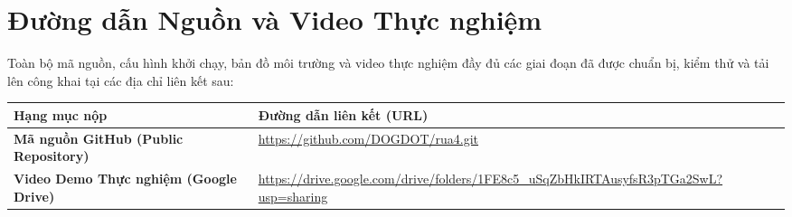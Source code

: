 \documentclass[12pt, a4paper]{article}
\begin{document}
\newpage
\section{Đường dẫn Nguồn và Video Thực nghiệm}

Toàn bộ mã nguồn, cấu hình khởi chạy, bản đồ môi trường và video thực nghiệm đầy đủ các giai đoạn đã được chuẩn bị, kiểm thử và tải lên công khai tại các địa chỉ liên kết sau:

\begin{table}[H]
\centering
{}
\begin{tabularx}{\linewidth}{p{4.2cm}X}
\toprule
\textbf{Hạng mục nộp} & \textbf{Đường dẫn liên kết (URL)} \\
\midrule
\textbf{Mã nguồn GitHub (Public Repository)} & \url{https://github.com/DOGDOT/rua4.git} \\[0.4cm]
\textbf{Video Demo Thực nghiệm (Google Drive)} & \url{https://drive.google.com/drive/folders/1FE8c5_uSqZbHkIRTAusyfsR3pTGa2SwL?usp=sharing} \\
\bottomrule
\end{tabularx}
\end{table}
\end{document}
